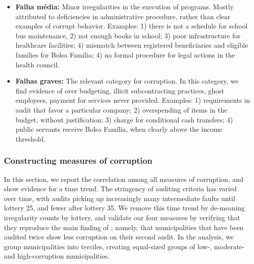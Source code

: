 {\begin{itemize}
    \item \textbf{Falha m\'{e}dia:} Minor irregularities in the execution of programs. Mostly attributed to deficiencies in administrative procedure, rather than clear examples of corrupt behavior. Examples: 1) there is not a schedule for school bus maintenance, 2) not enough books in school; 3) poor infrastructure for healthcare facilities; 4) mismatch between registered beneficiaries and eligible families for Bolsa Família; 4) no formal procedure for legal actions in the health council.
    \item \textbf{Falhas graves:} The relevant category for corruption. In this category, we find evidence of over budgeting, illicit subcontracting practices, ghost employees, payment for services never provided. Examples: 1) requirements in audit that favor a particular company; 2) overspending of items in the budget, without justification; 3) charge for conditional cash transfers; 4) public servants receive Bolsa Família, when clearly above the income threshold.
\end{itemize}

\subsubsection*{Constructing measures of corruption}

In this section, we report the correlation among all measures of corruption, and show evidence for a time trend. The stringency of auditing criteria has varied over time, with audits picking up increasingly many intermediate faults until lottery 25, and fewer after lottery 35. We remove this time trend by de-meaning irregularity counts by lottery, and validate our four measures by verifying that they reproduce the main finding of \citet{avis_government_2018}; namely, that municipalities that have been audited twice show less corruption on their second audit. In the analysis, we group municipalities into terciles, creating equal-sized groups of low-, moderate- and high-corruption municipalities. 

}
